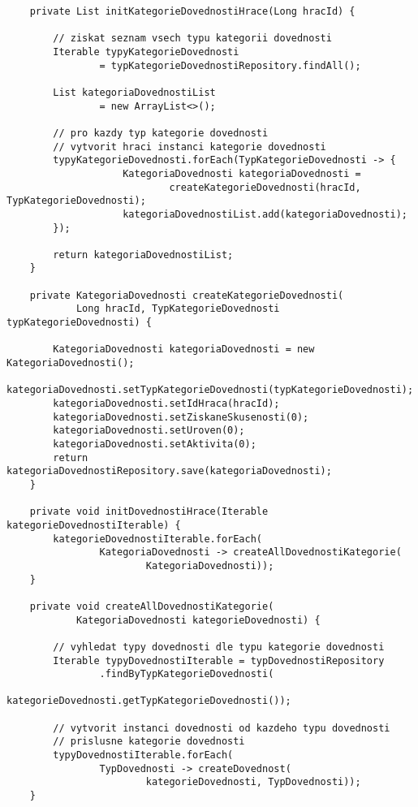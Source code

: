 \documentclass[twoside, 12pt]{article}
\begin{document}
{{\begin{lstlisting}
    private List initKategorieDovednostiHrace(Long hracId) {

        // ziskat seznam vsech typu kategorii dovednosti
        Iterable typyKategorieDovednosti
                = typKategorieDovednostiRepository.findAll();

        List kategoriaDovednostiList
                = new ArrayList<>();

        // pro kazdy typ kategorie dovednosti
        // vytvorit hraci instanci kategorie dovednosti
        typyKategorieDovednosti.forEach(TypKategorieDovednosti -> {
                    KategoriaDovednosti kategoriaDovednosti =
                            createKategorieDovednosti(hracId, TypKategorieDovednosti);
                    kategoriaDovednostiList.add(kategoriaDovednosti);
        });

        return kategoriaDovednostiList;
    }

    private KategoriaDovednosti createKategorieDovednosti(
            Long hracId, TypKategorieDovednosti typKategorieDovednosti) {

        KategoriaDovednosti kategoriaDovednosti = new KategoriaDovednosti();
        kategoriaDovednosti.setTypKategorieDovednosti(typKategorieDovednosti);
        kategoriaDovednosti.setIdHraca(hracId);
        kategoriaDovednosti.setZiskaneSkusenosti(0);
        kategoriaDovednosti.setUroven(0);
        kategoriaDovednosti.setAktivita(0);
        return kategoriaDovednostiRepository.save(kategoriaDovednosti);
    }

    private void initDovednostiHrace(Iterable kategorieDovednostiIterable) {
        kategorieDovednostiIterable.forEach(
                KategoriaDovednosti -> createAllDovednostiKategorie(
                        KategoriaDovednosti));
    }

    private void createAllDovednostiKategorie(
            KategoriaDovednosti kategorieDovednosti) {

        // vyhledat typy dovednosti dle typu kategorie dovednosti
        Iterable typyDovednostiIterable = typDovednostiRepository
                .findByTypKategorieDovednosti(
                        kategorieDovednosti.getTypKategorieDovednosti());

        // vytvorit instanci dovednosti od kazdeho typu dovednosti
        // prislusne kategorie dovednosti
        typyDovednostiIterable.forEach(
                TypDovednosti -> createDovednost(
                        kategorieDovednosti, TypDovednosti));
    }


\end{lstlisting}}}
\end{document}
